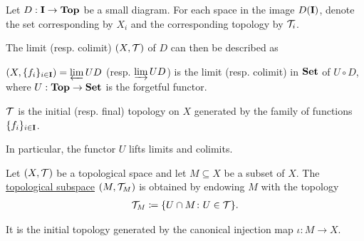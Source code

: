 \begin{proposition}\label{thm:initial_final_topology_limit}\cite{nLab:top}
  Let $D: \operatorname{\mathbf{I}} \to \operatorname{\mathbf{Top}}$ be a small diagram. For each space in the image $D(\operatorname{\mathbf{I}})$, denote the set corresponding by $X_i$ and the corresponding topology by $\mathcal T_i$.

  The limit (resp. colimit) $(X, \mathcal T)$ of $D$ can then be described as
  \begin{defenum}
    \item $(X, \{ f_i \}_{i \in \operatorname{\mathbf{I}}}) = \varprojlim UD$ (resp. $\varinjlim UD$) is the limit (resp. colimit) in $\operatorname{\mathbf{Set}}$ of $U \circ D$, where $U: \operatorname{\mathbf{Top}} \to \operatorname{\mathbf{Set}}$ is the forgetful functor.
    \item $\mathcal T$ is the initial (resp. final) topology on $X$ generated by the family of functions $\{ f_i \}_{i \in \operatorname{\mathbf{I}}}$.
  \end{defenum}

  In particular, the functor $U$ lifts limits and colimits.
\end{proposition}

\begin{definition}\label{def:topological_subspace}
  Let $(X, \mathcal T)$ be a topological space and let $M \subseteq X$ be a subset of $X$. The \uline{topological subspace} $(M, \mathcal T_M)$ is obtained by endowing $M$ with the topology
  \begin{align*}
    \mathcal T_M \coloneqq \{ U \cap M \colon U \in \mathcal T \}.
  \end{align*}

  It is the initial topology generated by the canonical injection map $\iota: M \to X$.
\end{definition}


